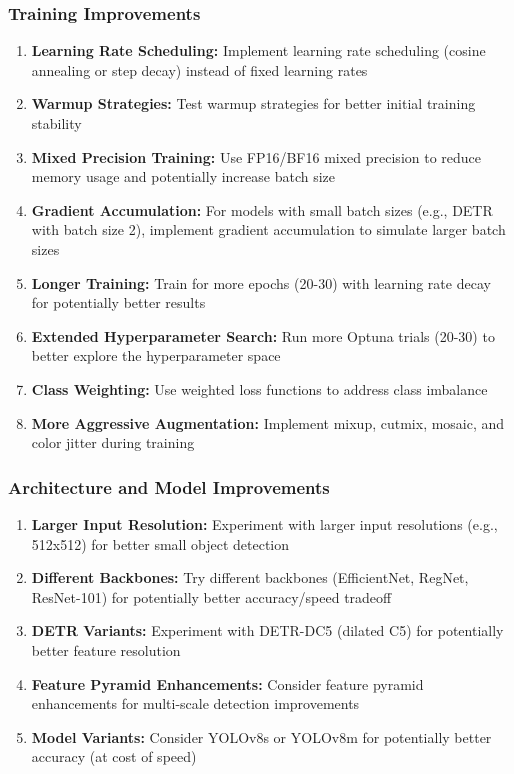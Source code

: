 \documentclass[12pt,a4paper]{article}
\begin{document}
\subsubsection{Training Improvements}

\begin{enumerate}
    \item \textbf{Learning Rate Scheduling:} Implement learning rate scheduling (cosine annealing or step decay) instead of fixed learning rates
    \item \textbf{Warmup Strategies:} Test warmup strategies for better initial training stability
    \item \textbf{Mixed Precision Training:} Use FP16/BF16 mixed precision to reduce memory usage and potentially increase batch size
    \item \textbf{Gradient Accumulation:} For models with small batch sizes (e.g., DETR with batch size 2), implement gradient accumulation to simulate larger batch sizes
    \item \textbf{Longer Training:} Train for more epochs (20-30) with learning rate decay for potentially better results
    \item \textbf{Extended Hyperparameter Search:} Run more Optuna trials (20-30) to better explore the hyperparameter space
    \item \textbf{Class Weighting:} Use weighted loss functions to address class imbalance
    \item \textbf{More Aggressive Augmentation:} Implement mixup, cutmix, mosaic, and color jitter during training
\end{enumerate}

\subsubsection{Architecture and Model Improvements}

\begin{enumerate}
    \item \textbf{Larger Input Resolution:} Experiment with larger input resolutions (e.g., 512x512) for better small object detection
    \item \textbf{Different Backbones:} Try different backbones (EfficientNet, RegNet, ResNet-101) for potentially better accuracy/speed tradeoff
    \item \textbf{DETR Variants:} Experiment with DETR-DC5 (dilated C5) for potentially better feature resolution
    \item \textbf{Feature Pyramid Enhancements:} Consider feature pyramid enhancements for multi-scale detection improvements
    \item \textbf{Model Variants:} Consider YOLOv8s or YOLOv8m for potentially better accuracy (at cost of speed)
\end{enumerate}
\end{document}
